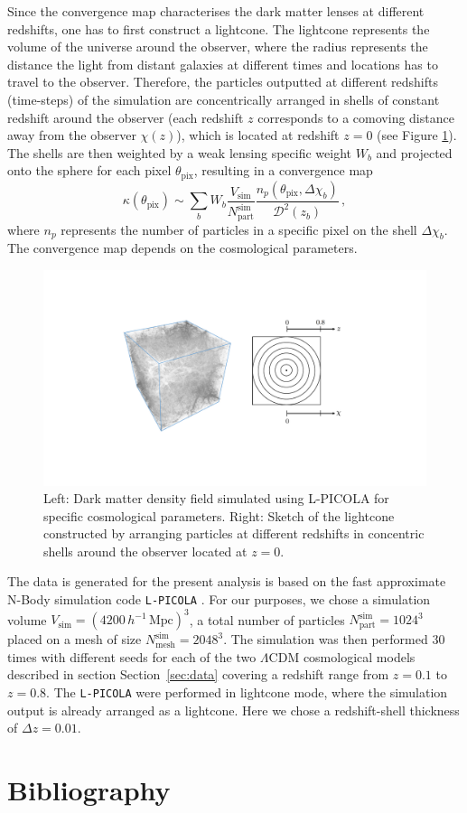 \documentclass[final,twocolumn,3p,times,sort&compress]{elsarticle}
\newcommand{\secref}[1]{Section~\ref{sec:#1}}
\newcommand{\1}{\b{1}}              %
\newcommand{\0}{\b{0}}              %
\newcommand{\pkg}[1]{\texttt{#1}}
\begin{document}
Since the convergence map characterises the dark matter lenses at different redshifts, one has to first construct a lightcone. The lightcone represents the volume of the universe around the observer, where the radius represents the distance the light from distant galaxies at different times and locations has to travel to the observer. Therefore, the particles outputted at different redshifts (time-steps) of the simulation are concentrically arranged in shells of constant redshift around the observer (each redshift $z$ corresponds to a comoving distance away from the observer $\chi(z)$), which is located at redshift $z=0$ (see Figure \ref{fig:sketch_lightcone_simulation}). The shells are then weighted by a weak lensing specific weight $W_b$ and projected onto the sphere for each pixel $\theta_\mathrm{pix}$, resulting in a convergence map
\begin{equation}
\kappa (\theta_\mathrm{pix}) \sim \sum_b W_b \frac{V_\mathrm{sim}}{N_\mathrm{part}^\mathrm{sim}} \frac{n_p (\theta_\mathrm{pix}, \Delta \chi_b)}{\mathcal{D}^2 (z_b)}  \, ,
\end{equation}
where $n_p$ represents the number of particles in a specific pixel on the shell $\Delta \chi_b$. The convergence map depends on the cosmological parameters.

\begin{figure}[ht!]
	\centering
	\includegraphics[width=\linewidth]{sketch_lightcone_simulation}
	\caption{Left: Dark matter density field simulated using L-PICOLA for specific cosmological parameters. Right: Sketch of the lightcone constructed by arranging particles at different redshifts in concentric shells around the observer located at $z=0$.}
	\label{fig:sketch_lightcone_simulation}
\end{figure}

The data is generated for the present analysis is based on the fast approximate N-Body simulation code \pkg{L-PICOLA} \citep{howlett2015lpicola}. For our purposes, we chose a simulation volume $V_\mathrm{sim} = (4200 \, h^{-1}\, \mathrm{Mpc})^3$, a total number of particles $N_\mathrm{part}^\mathrm{sim} = 1024^3$ placed on a mesh of size $N_\mathrm{mesh}^\mathrm{sim} = 2048^3$. The simulation was then performed 30 times with different seeds for each of the two $\Lambda$CDM cosmological models described in section \secref{data} covering a redshift range from $z = 0.1$ to $z = 0.8$. The \pkg{L-PICOLA} were performed in lightcone mode, where the simulation output is already arranged as a lightcone. Here we chose a redshift-shell thickness of $\Delta z = 0.01$.

\section*{Bibliography}


\end{document}
